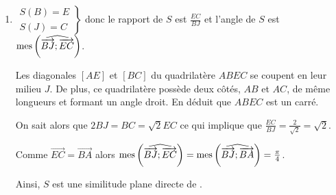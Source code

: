 \begin{enumerate}
\begin{enumerate}
							Comme $f$ est la compos\'ee d'une rotation d'angle $\frac{\pi}{2}$ et d'une translation 
							alors $f$ est une rotation d'angle $\frac{\pi}{2}$.
							Comme $f(I) = I$, alors $I$ est le centre de $f$.
							
							Ainsi, .
					\item {}
						On a $g(K) = t \left( r(K) \right) = t(I) = K$.
						Donc .
						
							Comme $g$ est la compos\'ee d'une translation et d'une rotation d'angle $\frac{\pi}{2}$
							alors $g$ est une rotation d'angle $\frac{\pi}{2}$.
							Comme $g(K) = K$, alors $K$ est le centre de $g$.
							
							Ainsi, .
				\end{enumerate}
			\item {}
				$\displaystyle{
					\left.
						\begin{array}{r}
							S(B) = E \\
							S(J) = C
						\end{array}
					\right\rbrace
				}$
				donc 
				le rapport de $S$ est $\frac{EC}{BJ}$ et
				l'angle de $S$ est $\mathrm{mes}\left( \widehat{ \overrightarrow{BJ} ; \overrightarrow{EC} } \right)$.
				
				Les diagonales $[AE]$ et $[BC]$ du quadrilat\`ere $ABEC$ se coupent en leur milieu $J$.
				De plus, ce quadrilat\`ere poss\`ede deux c\^ot\'es, $AB$ et $AC$, de m\^eme longueurs et formant un angle droit.
				En d\'eduit que $ABEC$ est un carr\'e.
				
				On sait alors que $2 BJ = BC = \sqrt{2} EC$ ce qui implique que $\frac{EC}{BJ} = \frac{2}{\sqrt{2}} = \sqrt{2}$.
				
				Comme $\overrightarrow{EC} = \overrightarrow{BA}$ alors $\mathrm{mes}\left( \widehat{ \overrightarrow{BJ} ; \overrightarrow{EC} } \right) = \mathrm{mes}\left( \widehat{ \overrightarrow{BJ} ; \overrightarrow{BA} } \right) = \frac{\pi}{4}$.
				
				Ainsi, $S$ est une similitude plane directe de
				.
		\end{enumerate}

